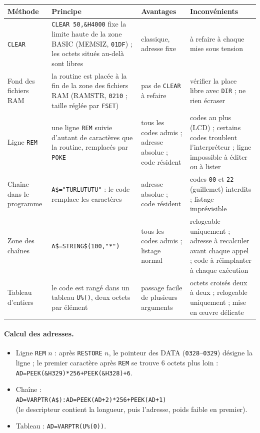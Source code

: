 \documentclass[a4paper,10pt]{article}
\newcommand{\hex}[1]{\texttt{#1}}
\begin{document}
\begin{center}\small
\begin{tabular}{@{}>{\raggedright}p{3.3cm}>{\raggedright}p{4.5cm}>{\raggedright}p{3.6cm}>{\raggedright\arraybackslash}p{3.6cm}@{}}
\toprule
Méthode & Principe & Avantages & Inconvénients \\
\midrule
\texttt{CLEAR} & \texttt{CLEAR 50,\&H4000} fixe la limite haute de la zone BASIC (MEMSIZ, \hex{01DF}) ; les octets situés au-delà sont libres & classique, adresse fixe & à refaire à chaque mise sous tension \\
\addlinespace
Fond des fichiers RAM & la routine est placée à la fin de la zone des fichiers RAM (RAMSTR, \hex{0210} ; taille réglée par \texttt{FSET}) & pas de \texttt{CLEAR} à refaire & vérifier la place libre avec \texttt{DIR} ; ne rien écraser \\
\addlinespace
Ligne \texttt{REM} & une ligne \texttt{REM} suivie d'autant de caractères que la routine, remplacés par \texttt{POKE} & tous les codes admis ; adresse absolue ; code résident & 80 codes au plus (LCD) ; certains codes troublent l'interpréteur ; ligne impossible à éditer ou à lister \\
\addlinespace
Chaîne dans le programme & \texttt{A\$="TURLUTUTU"} : le code remplace les caractères & adresse absolue ; code résident & codes \hex{00} et \hex{22} (guillemet) interdits ; listage imprévisible \\
\addlinespace
Zone des chaînes & \texttt{A\$=STRING\$(100,"*")} & tous les codes admis ; listage normal & relogeable uniquement ; adresse à recalculer avant chaque appel ; code à réimplanter à chaque exécution \\
\addlinespace
Tableau d'entiers & le code est rangé dans un tableau \texttt{U\%()}, deux octets par élément & passage facile de plusieurs arguments & octets croisés deux à deux ; relogeable uniquement ; mise en œuvre délicate \\
\bottomrule
\end{tabular}
\end{center}

\paragraph{Calcul des adresses.}
\begin{itemize}
  \item Ligne \texttt{REM} $n$ : après \texttt{RESTORE} $n$, le pointeur des
        DATA (\hex{0328}--\hex{0329}) désigne la ligne ; le premier caractère
        après \texttt{REM} se trouve 6 octets plus loin :\\
        \texttt{AD=PEEK(\&H329)*256+PEEK(\&H328)+6}.
  \item Chaîne :\\ \texttt{AD=VARPTR(A\$):AD=PEEK(AD+2)*256+PEEK(AD+1)}\\
        (le descripteur contient la longueur, puis l'adresse, poids faible
        en premier).
  \item Tableau : \texttt{AD=VARPTR(U\%(0))}.
\end{itemize}
\end{document}
